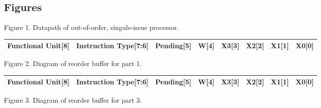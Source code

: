 \documentclass[11pt]{article}
\begin{document}
\subsection*{Figures}

\begin{center}
\end{center}
Figure 1. Datapath of out-of-order, singule-issue processor.

\begin{center}
    \begin{tabular}{|p{1in}| p{1in}| p{0.8in} | p{0.4in} | p{0.4in}| p{0.4in} | p{0.4in} | p{0.4in} |} 
 \hline
 Functional Unit[8] & Instruction Type[7:6] & Pending[5] & W[4] & X3[3] & X2[2] & X1[1]  & X0[0] \\
 \hline

\end{tabular}
\end{center}
Figure 2. Diagram of reorder buffer for part 1. \\

\begin{center}
    \begin{tabular}{|p{1in}| p{1in}| p{0.8in} | p{0.4in} | p{0.4in}| p{0.4in} | p{0.4in} | p{0.4in} |} 
 \hline
 Functional Unit[8] & Instruction Type[7:6] & Pending[5] & W[4] & X3[3] & X2[2] & X1[1]  & X0[0] \\
 \hline

\end{tabular}
\end{center}
Figure 3. Diagram of reorder buffer for part 3. \\
\end{document}
